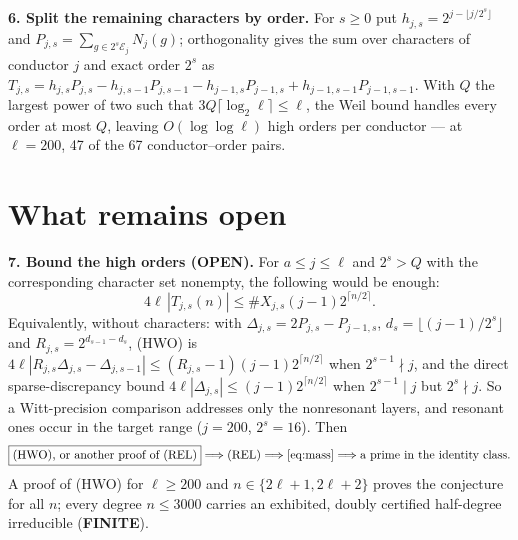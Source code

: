 \documentclass[10pt]{article}
\newcommand{\E}{\mathcal E}
\newcommand{\finite}{\textcolor{finite}{\textbf{FINITE}}}
\newcommand{\openstatus}{\textcolor{open}{\textbf{OPEN}}}
\begin{document}
\textbf{6. Split the remaining characters by order.} For $s\geq0$ put
$h_{j,s}=2^{j-\lfloor j/2^s\rfloor}$ and
$P_{j,s}=\sum_{g\in2^s\E_j}N_j(g)$; orthogonality gives the sum over
characters of conductor $j$ and exact order $2^s$ as
$T_{j,s}=h_{j,s}P_{j,s}-h_{j,s-1}P_{j,s-1}-h_{j-1,s}P_{j-1,s}
+h_{j-1,s-1}P_{j-1,s-1}$.
With $Q$ the largest power of two such that
$3Q\lceil\log_2\ell\rceil\leq\ell$, the Weil bound handles every order at most
$Q$, leaving $O(\log\log\ell)$ high orders per conductor --- at $\ell=200$, 47
of the 67 conductor--order pairs.

\section{What remains open}

\textbf{7. Bound the high orders (\openstatus).} For $a\leq j\leq\ell$ and
$2^s>Q$ with the corresponding character set nonempty, the following would be
enough:
\begin{equation*}\tag{HWO}
 4\ell\,|T_{j,s}(n)|\leq\#X_{j,s}(j-1)2^{\lceil n/2\rceil}.
\end{equation*}
Equivalently, without characters: with $\Delta_{j,s}=2P_{j,s}-P_{j-1,s}$,
$d_s=\lfloor(j-1)/2^s\rfloor$ and $R_{j,s}=2^{d_{s-1}-d_s}$, (HWO) is
$4\ell|R_{j,s}\Delta_{j,s}-\Delta_{j,s-1}|\leq(R_{j,s}-1)(j-1)2^{\lceil
n/2\rceil}$ when $2^{s-1}\nmid j$, and the direct sparse-discrepancy bound
$4\ell|\Delta_{j,s}|\leq(j-1)2^{\lceil n/2\rceil}$ when $2^{s-1}\mid j$ but
$2^s\nmid j$. So a Witt-precision comparison addresses only the nonresonant
layers, and resonant ones occur in the target range ($j=200$, $2^s=16$).
Then
\[
 \boxed{\text{(HWO), or another proof of (REL)}}
 \Longrightarrow\text{(REL)}\Longrightarrow\eqref{eq:mass}
 \Longrightarrow\text{a prime in the identity class}.
\]
A proof of (HWO) for $\ell\geq200$ and $n\in\{2\ell+1,2\ell+2\}$ proves the
conjecture for all $n$; every degree $n\leq3000$ carries an exhibited,
doubly certified half-degree irreducible (\finite).
\end{document}
